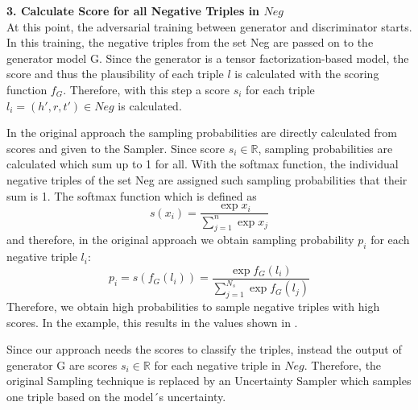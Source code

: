 \textbf{3. Calculate Score for all Negative Triples in $Neg$}\\
%
At this point, the adversarial training between generator and discriminator starts.
In this training, the negative triples from the set Neg are passed on to the generator model G.
Since the generator is a tensor factorization-based model, the score and thus the plausibility of each triple $l$ is calculated with the scoring function $f_G$.
Therefore, with this step a score $s_i$ for each triple $l_i = (h',r,t') \in Neg$ is calculated.

In the original \kbgan approach the sampling probabilities are directly calculated from scores and given to the Sampler.
Since score $s_i \in \mathbb{R}$, sampling probabilities are calculated which sum up to 1 for all.
With the softmax function, the individual negative triples of the set Neg are assigned such sampling probabilities that their sum is 1.
The softmax function which is defined as 
\begin{equation}
    s(x_i) = \frac{\exp{x_i}}{\sum_{j=1}^{n}{\exp{x_j}}}
\end{equation}
and therefore, in the  original approach we obtain sampling probability $p_i$ for each negative triple $l_i$:
\begin{equation}
    p_i = s(f_G(l_i)) = \frac{\exp{f_G(l_i)}}{\sum_{j=1}^{N_s}{\exp{f_G(l_j)}}}
\end{equation}
Therefore, we obtain high probabilities to sample negative triples with high scores.
In the example, this results in the values shown in .


Since our approach needs the scores to classify the triples, instead the output of generator G are scores $s_i \in \mathbb{R}$ for each negative triple in $Neg$.
Therefore, the original Sampling technique is replaced by an Uncertainty Sampler which samples one triple based on the model´s uncertainty.


